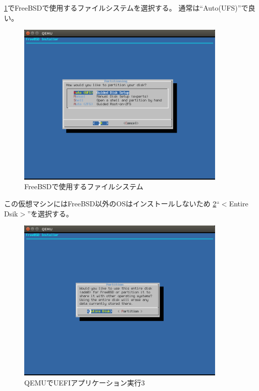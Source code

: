 \documentclass[a4j]{jarticle}
\begin{document}
\ref{fig:FreeBSD_FS}でFreeBSDで使用するファイルシステムを選択する。
通常は``Auto(UFS)''で良い。
\begin{figure}[htbp]
	\centering
	\includegraphics[width=10cm]{./IMG/FreeBSD_AUTO.png}
    \caption{FreeBSDで使用するファイルシステム}
    \label{fig:FreeBSD_FS}
\end{figure}
この仮想マシンにはFreeBSD以外のOSはインストールしないため
\ref{fig:FreeBSD_Q}``$<$Entire Dsik$>$''を選択する。
\begin{figure}[htbp]
	\centering
	\includegraphics[width=10cm]{./IMG/FreeBSD_ENTRY.png}
    \caption{QEMUでUEFIアプリケーション実行3}
    \label{fig:FreeBSD_Q}
\end{figure}
\end{document}
